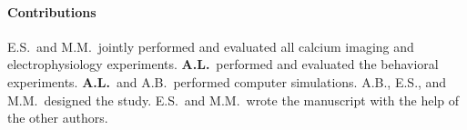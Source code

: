\paragraph{Contributions} E.S.\ and M.M.\ jointly performed and evaluated all calcium imaging and electrophysiology experiments. \textbf{A.L.}\ performed and evaluated the behavioral experiments. \textbf{A.L.}\ and A.B.\ performed computer simulations. A.B., E.S., and M.M.\ designed the study. E.S.\ and M.M.\ wrote the manuscript with the help of the other authors.

\cleardoublepage


